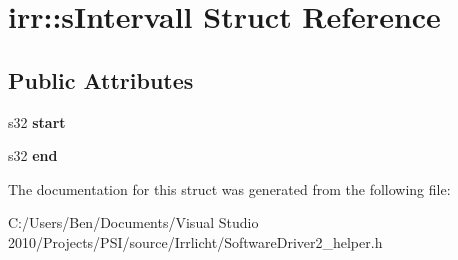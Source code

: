 \hypertarget{structirr_1_1s_intervall}{\section{irr\-:\-:s\-Intervall Struct Reference}
\label{structirr_1_1s_intervall}
}
\subsection*{Public Attributes}
\begin{DoxyCompactItemize}
\item 
\hypertarget{structirr_1_1s_intervall_a8f1a1cf65e493b2c6d99f2d6ba5d694d}{s32 {\bfseries start}}\label{structirr_1_1s_intervall_a8f1a1cf65e493b2c6d99f2d6ba5d694d}

\item 
\hypertarget{structirr_1_1s_intervall_ae69a52ee06441b8a0f0bb8f410abaa7f}{s32 {\bfseries end}}\label{structirr_1_1s_intervall_ae69a52ee06441b8a0f0bb8f410abaa7f}

\end{DoxyCompactItemize}


The documentation for this struct was generated from the following file\-:\begin{DoxyCompactItemize}
\item 
C\-:/\-Users/\-Ben/\-Documents/\-Visual Studio 2010/\-Projects/\-P\-S\-I/source/\-Irrlicht/Software\-Driver2\-\_\-helper.\-h\end{DoxyCompactItemize}
